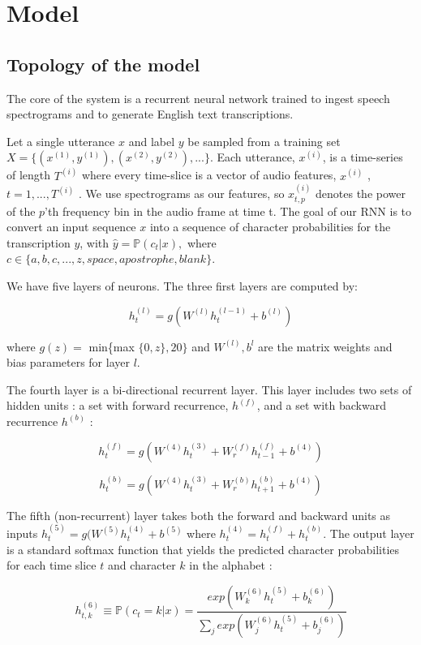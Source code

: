 \documentclass[12pt]{article}
\begin{document}
\section{Model}

\subsection{Topology of the model}

The core of the system is a recurrent neural network trained to ingest speech spectrograms and to generate English text transcriptions.

Let a single utterance $x$ and label $y$ be sampled from a
training set $X = \{(x^{(1)}, y^{(1)}), (x^{(2)}, y^{(2)}), . . .\}. $ Each utterance, $x^{(i)}$, is a time-series of length $T^{(i)}$
where every time-slice is a vector of audio features, $x^{(i)}$ ,$ t = 1, . . . , T^{(i)}$ . We use spectrograms as our features, so $x^{(i)}_{t,p}$ denotes the power of the $p$’th frequency bin in the audio frame at time t. The goal of our RNN is to convert an input sequence $x$ into a sequence of character probabilities for the transcription $y$, with $ \hat{y}= \mathbb{P}(c_t |x),$ where $c \in \{a,b,c, . . . , z, space, apostrophe, blank\}.$

We have five layers of neurons. The three first layers are computed by:

\[ h_t^{(l)} = g(W^{(l)}h_t^{(l-1)} + b^{(l)}) \]

where $g(z) =$ min\{max $\{0,z\}, 20\}$ and $W^{(l)}, b^{l}$ are the matrix weights and bias parameters for layer $l$.

The fourth layer is a bi-directional recurrent layer. This layer includes two sets of hidden units : a set with forward recurrence, $h^{(f)}$, and a set with backward recurrence $h^{(b)}$ : 

\[ h_t^{(f)} = g(W^{(4)}h_t^{(3)} + W_r^{(f)}h_{t-1}^{(f)} + b^{(4)}) \]

\[ h_t^{(b)} = g(W^{(4)}h_t^{(3)} + W_r^{(b)}h_{t+1}^{(b)} + b^{(4)}) \]

The fifth (non-recurrent) layer takes both the forward and backward units as inputs $h_t^{(5)} = g(W^{(5)}h_t^{(4)} + b^{(5)} $ where $h_t^{(4)} = h_t^{(f)} + h_t^{(b)}$. The output layer is a standard softmax function that yields the predicted character probabilities for each time slice $t$ and character $k$ in the alphabet :

\[ h_{t,k}^{(6)} \equiv \mathbb{P}(c_t=k | x) = \frac{exp(W_k^{(6)}h_t^{(5)} + b_k^{(6)})}{\sum_j exp(W_j^{(6)}h_t^{(5)} + b_j^{(6)})} \]
\end{document}
